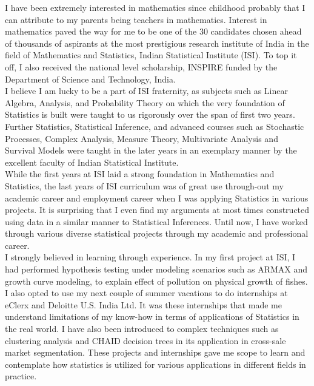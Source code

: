 \documentclass[10pt]{article}
\begin{document}
I have been extremely interested in mathematics since childhood probably that I can attribute to my parents being teachers in mathematics. Interest in mathematics paved the way for me to be one of the 30 candidates chosen ahead of thousands of aspirants at the most prestigious research institute of India in the field of Mathematics and Statistics, Indian Statistical Institute (ISI). To top it off, I also received the national level scholarship, INSPIRE funded by the Department of Science and Technology, India. \\

I believe I am lucky to be a part of ISI fraternity, as subjects such as Linear Algebra, Analysis, and Probability Theory on which the very foundation of Statistics is built were taught to us rigorously over the span of first two years. Further Statistics, Statistical Inference, and advanced courses such as Stochastic Processes, Complex Analysis, Measure Theory, Multivariate Analysis and Survival Models were taught in the later years in an exemplary manner by the excellent faculty of Indian Statistical Institute. \\

While the first years at ISI laid a strong foundation in Mathematics and Statistics, the last years of ISI curriculum was of great use through-out my academic career and employment career when I was applying Statistics in various projects. It is surprising that I even find my arguments at most times constructed using data in a similar manner to Statistical Inferences. Until now, I have worked through various diverse statistical projects through my academic and professional career. \\

I strongly believed in learning through experience. In my first project at ISI, I had performed hypothesis testing under modeling scenarios such as ARMAX and growth curve modeling, to explain effect of pollution on physical growth of fishes. I also opted to use my next couple of summer vacations to do internships at eClerx and Deloitte U.S. India Ltd. It was these internships that made me understand limitations of my know-how in terms of applications of Statistics in the real world. I have also been introduced to complex techniques such as clustering analysis and CHAID decision trees in its application in cross-sale market segmentation. These projects and internships gave me scope to learn and contemplate how statistics is utilized for various applications in different fields in practice. \\
\end{document}
